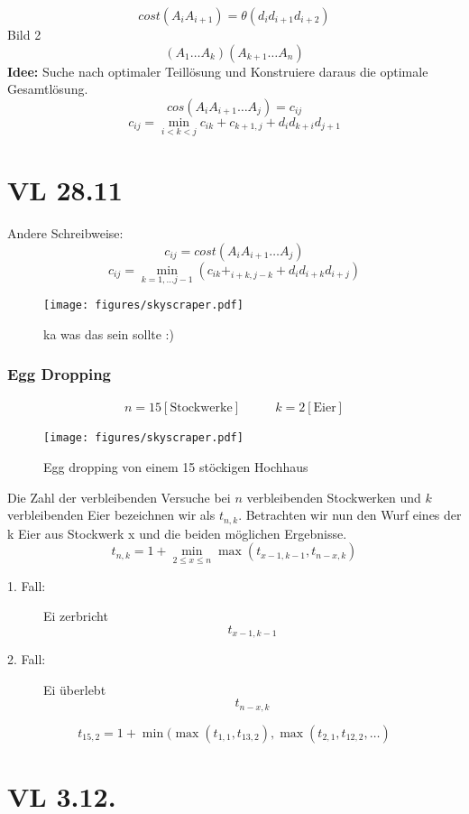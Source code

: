\documentclass[a4paper,draft,twoside,10pt]{report}
\begin{document}
\[cost(A_i A_{i+1})=\theta(d_i d_{i+1} d_{i+2})\]
Bild 2\\
\[(A_1\hdots A_k)(A_{k+1}\hdots A_n)\]
\textbf{Idee:} Suche nach optimaler Teillösung und Konstruiere daraus die optimale Gesamtlösung.\\
\[cos(A_i A_{i+1} \hdots A_j)=c_{ij}\]
\[c_{ij}=\min_{i<k<j}c_{ik}+c_{k+1,j}+d_{i}d_{k+i}d_{j+1}\]
\chapter{VL 28.11}
Andere Schreibweise:
\[c_{ij}=cost(A_i A_{i+1} \hdots A_j)\]
\[c_{ij}=\min_{k=1,\hdots j-1}(c_{ik}+_{i+k,j-k}+d_id_{i+k}d_{i+j})\]
\begin{figure}[H]\center
\texttt{[image: figures/skyscraper.pdf]}
\caption{ka was das sein sollte :)}
\end{figure}

\subsection{Egg Dropping}
\begin{align*}&n=15[\mbox{Stockwerke}]&\,&\,&k=2[\mbox{Eier}]&
\end{align*}
\begin{figure}[H]\center
\texttt{[image: figures/skyscraper.pdf]}
\caption{Egg dropping von einem 15 stöckigen Hochhaus}
\end{figure}
Die Zahl der verbleibenden Versuche bei $n$ verbleibenden Stockwerken und $k$ verbleibenden Eier bezeichnen wir als $t_{n,k}$.
Betrachten wir nun den Wurf eines der k Eier aus Stockwerk x und die beiden möglichen Ergebnisse.
\[t_{n,k}=1+\min_{2\le x\le n}\max(t_{x-1,k-1},t_{n-x,k})\]
\begin{description}
\item[1. Fall: ] Ei zerbricht\[t_{x-1,k-1}\]
\item[2. Fall: ] Ei überlebt\[t_{n-x,k}\]
\end{description}
\[t_{15,2}=1+\min(\max(t_{1,1},t_{13,2}),\max(t_{2,1},t_{12,2},\hdots)\]



\chapter{VL 3.12.}
\end{document}
